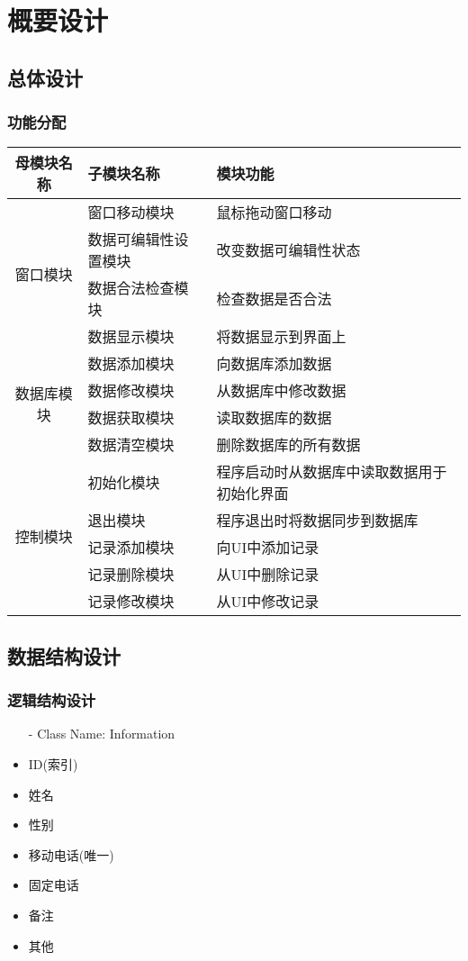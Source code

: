 \chapter{概要设计}
\section{总体设计}

	\subsection{功能分配}
		\begin{tabular}{|c|l|l|}
			\hline
			母模块名称& 子模块名称 & 模块功能 \\
			\hline 
			\multirow{4}{*}{ 窗口模块}
			& 窗口移动模块 & 鼠标拖动窗口移动 \\
			\cline{2-3}
			& 数据可编辑性设置模块 & 改变数据可编辑性状态 \\
			\cline{2-3}
			& 数据合法检查模块 & 检查数据是否合法 \\
			\cline{2-3}
			& 数据显示模块 & 将数据显示到界面上 \\
			\hline
			\multirow{4}{*}{
			数据库模块} 
			& 数据添加模块 & 向数据库添加数据 \\
			\cline{2-3}
			& 数据修改模块 & 从数据库中修改数据 \\
			\cline{2-3}
			& 数据获取模块 & 读取数据库的数据 \\
			\cline{2-3}
			& 数据清空模块 & 删除数据库的所有数据 \\
			\hline
			\multirow{5}{*}{控制模块}
			& 初始化模块 & 程序启动时从数据库中读取数据用于初始化界面 \\
			\cline{2-3}
			& 退出模块 & 程序退出时将数据同步到数据库 \\
			\cline{2-3}
			& 记录添加模块 & 向UI中添加记录 \\
			\cline{2-3}
			& 记录删除模块 & 从UI中删除记录 \\
			\cline{2-3}
			& 记录修改模块 & 从UI中修改记录 \\
			\hline
		\end{tabular}
\section{数据结构设计}
	\subsection{逻辑结构设计}
		\begin{itemize}
			\item[-] Class Name: Information
			\item ID(索引)
			\item 姓名
			\item 性别
			\item 移动电话(唯一)
			\item 固定电话
			\item 备注
			\item 其他
		\end{itemize}
